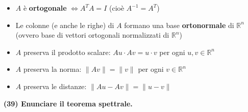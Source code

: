 \documentclass[10pt]{extarticle}
\begin{document}
\begin{itemize}
    \item \( A \) è \textbf{ortogonale} \( \iff A^T A = I \) (cioè \( A^{-1} = A^T \))
    \item Le colonne (e anche le righe) di \( A \) formano una base \textbf{ortonormale} di \( \mathbb{R}^n \) (ovvero base di vettori ortogonali normalizzati di $\mathbb{R}^n$)
    \item \( A \) preserva il prodotto scalare: \( A u \cdot A v = u \cdot v \) per ogni \( u, v \in \mathbb{R}^n \)
    \item \( A \) preserva la norma: \( \|A v\| = \|v\| \) per ogni \( v \in \mathbb{R}^n \)
    \item \( A \) preserva le distanze: \( \|A u - A v\| = \|u - v\| \)
\end{itemize}
\textbf{(39) Enunciare il teorema spettrale.} \\
\end{document}

